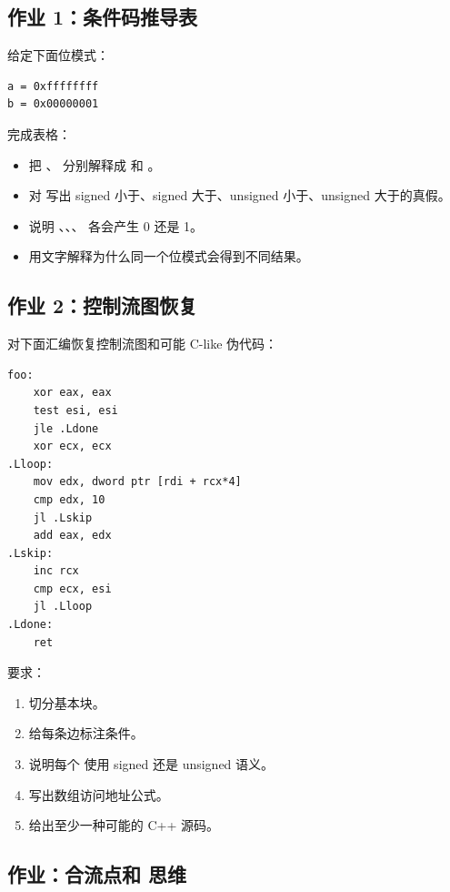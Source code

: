 \begin{exercisebox}
\subsection*{作业 1：条件码推导表}

给定下面位模式：

\begin{lstlisting}
a = 0xffffffff
b = 0x00000001
\end{lstlisting}

完成表格：

\begin{itemize}
  \item 把 、 分别解释成  和 。
  \item 对  写出 signed 小于、signed 大于、unsigned 小于、unsigned 大于的真假。
  \item 说明 、、、 各会产生 0 还是 1。
  \item 用文字解释为什么同一个位模式会得到不同结果。
\end{itemize}

\subsection*{作业 2：控制流图恢复}

对下面汇编恢复控制流图和可能 C-like 伪代码：

\begin{lstlisting}
foo:
    xor eax, eax
    test esi, esi
    jle .Ldone
    xor ecx, ecx
.Lloop:
    mov edx, dword ptr [rdi + rcx*4]
    cmp edx, 10
    jl .Lskip
    add eax, edx
.Lskip:
    inc rcx
    cmp ecx, esi
    jl .Lloop
.Ldone:
    ret
\end{lstlisting}

要求：

\begin{enumerate}
  \item 切分基本块。
  \item 给每条边标注条件。
  \item 说明每个  使用 signed 还是 unsigned 语义。
  \item 写出数组访问地址公式。
  \item 给出至少一种可能的 C++ 源码。
\end{enumerate}

\subsection*{作业：合流点和  思维}


\end{exercisebox}
